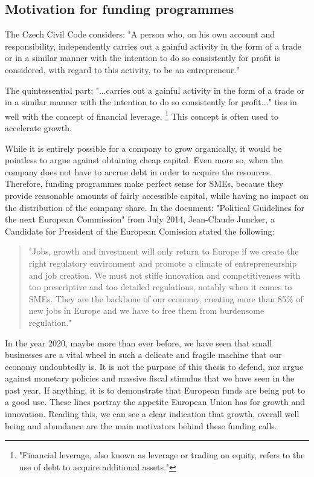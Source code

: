 \documentclass[12pt,oneside]{fithesis2}
\begin{document}
    \subsection{Motivation for funding programmes}
    The Czech Civil Code considers: "A person who, on his own account and responsibility, independently carries out a gainful activity in the form of a trade or in a similar manner with the intention to do so consistently for profit is considered, with regard to this activity, to be an entrepreneur."\cite{entrepreneur-law}
    \par
    The quintessential part: "...carries out a gainful activity in the form of a trade or in a similar manner with the intention to do so consistently for profit..."\cite{entrepreneur-law} ties in well with the concept of financial leverage. \footnote{"Financial leverage, also known as leverage or trading on equity, refers to the use of debt to acquire additional assets."\cite{financial-leverage}} This concept is often used to accelerate growth.
    \par
    While it is entirely possible for a company to grow organically, it would be pointless to argue against obtaining cheap capital. Even more so, when the company does not have to accrue debt in order to acquire the resources. Therefore, funding programmes make perfect sense for SMEs, because they provide reasonable amounts of fairly accessible capital, while having no impact on the distribution of the company share.
    \newline\newline
    In the document: "Political Guidelines for the next European Commission" from  July 2014, Jean-Claude Juncker, a Candidate for President of the European Comission stated the following: \blockquote{"Jobs, growth and investment will only return to Europe if we create the right regulatory environment and promote a climate of entrepreneurship and job creation. We must not stifle innovation and competitiveness with too prescriptive and too detailed regulations, notably when it comes to SMEs. They are the backbone of our economy, creating more than 85\% of new jobs in Europe and we have to free them from burdensome regulation."\cite{juncker-political-guidelines}}
    In the year 2020, maybe more than ever before, we have seen that small businesses are a vital wheel in such a delicate and fragile machine that our economy undoubtedly is. It is not the purpose of this thesis to defend, nor argue against monetary policies and massive fiscal stimulus that we have seen in the past year. If anything, it is to demonstrate that European funds are being put to a good use. These lines portray the appetite European Union has for growth and innovation. Reading this, we can see a clear indication that growth, overall well being and abundance are the main motivators behind these funding calls.
\end{document}
